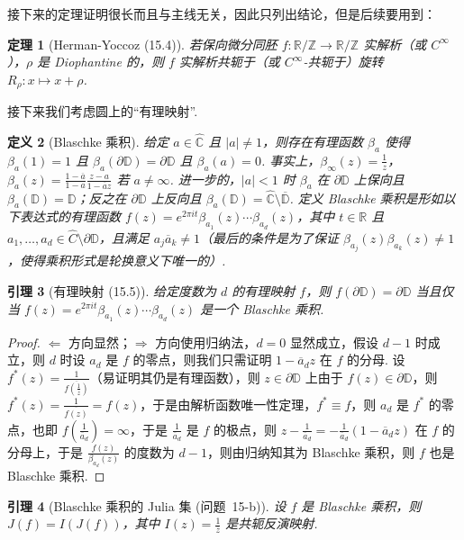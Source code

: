 \documentclass[11pt, a4paper, oneside]{ctexart}
\newtheorem{theorem}{定理}[section]
\newtheorem{definition}[theorem]{定义}
\newtheorem{lemma}[theorem]{引理}
\newcommand{\C}{\mathbb{C}}
\newcommand{\D}{\mathbb{D}}
\newcommand{\R}{\mathbb{R}}
\newcommand{\Z}{\mathbb{Z}}
\newcommand{\abs}[1]{\left|{#1}\right|}
\begin{document}
    接下来的定理证明很长而且与主线无关，因此只列出结论，但是后续要用到：
    \begin{theorem}[Herman-Yoccoz (15.4)]\label{15.4}
        若保向微分同胚 $f:\R/\Z\to \R/\Z$ 实解析（或 $C^{\infty}$），$\rho$ 是 Diophantine 的，则 $f$ 实解析共轭于（或 $C^{\infty}$-共轭于）旋转 $R_{\rho}:x\mapsto x+\rho$.
    \end{theorem}

    接下来我们考虑圆上的“有理映射”.
    \begin{definition}[Blaschke 乘积]
        给定 $a\in\hat{\C}$ 且 $\abs{a}\neq 1$，则存在有理函数 $\beta_a$ 使得 $\beta_a(1)=1$ 且 $\beta_a(\partial \D)=\partial\D$ 且 $\beta_a(a)=0$. 事实上，$\beta_{\infty}(z)=\frac{1}{z}$，$\beta_a(z)=\frac{1-\overline{a}}{1-a}\frac{z-a}{1-\overline{a}z}$ 若 $a\neq\infty$. 进一步的，$\abs{a}<1$ 时 $\beta_a$ 在 $\partial \D$ 上保向且 $\beta_a(\D)=\D$；反之在 $\partial \D$ 上反向且 $\beta_a(\D)=\hat{\C}\setminus \overline{\D}$. 定义 Blaschke 乘积是形如以下表达式的有理函数 $f(z)=e^{2\pi it}\beta_{a_1}(z)\cdots\beta_{a_d}(z)$，其中 $t\in\R$ 且 $a_1,\ldots,a_d\in\hat{C}\setminus \partial\D$，且满足 $a_j\overline{a}_k\neq 1$（最后的条件是为了保证 $\beta_{a_j}(z)\beta_{a_k}(z)\neq 1$，使得乘积形式是轮换意义下唯一的）.
    \end{definition}
    \begin{lemma}[有理映射 (15.5)]
        给定度数为 $d$ 的有理映射 $f$，则 $f(\partial\D)=\partial\D$ 当且仅当 $f(z)=e^{2\pi it}\beta_{a_1}(z)\cdots\beta_{a_d}(z)$ 是一个 Blaschke 乘积.
    \end{lemma}
    \begin{proof}
        $\Leftarrow$ 方向显然；$\Rightarrow$ 方向使用归纳法，$d=0$ 显然成立，假设 $d-1$ 时成立，则 $d$ 时设 $a_d$ 是 $f$ 的零点，则我们只需证明 $1-\overline{a}_d z$ 在 $f$ 的分母. 设 $f^*(z)=\frac{1}{\overline{f(\frac{1}{\overline{z}})}}$（易证明其仍是有理函数），则 $z\in\partial\D$ 上由于 $f(z)\in\partial\D$，则 $f^*(z)=\frac{1}{\overline{f(z)}}=f(z)$，于是由解析函数唯一性定理，$f^*\equiv f$，则 $a_d$ 是 $f^*$ 的零点，也即 $f(\frac{1}{\overline{a}_d})=\infty$，于是 $\frac{1}{\overline{a}_d}$ 是 $f$ 的极点，则 $z-\frac{1}{\overline{a}_d}=-\frac{1}{\overline{a}_d}(1-\overline{a}_d z)$ 在 $f$ 的分母上，于是 $\frac{f(z)}{\beta_{a_d}(z)}$ 的度数为 $d-1$，则由归纳知其为 Blaschke 乘积，则 $f$ 也是 Blaschke 乘积.
    \end{proof}
    \begin{lemma}[Blaschke 乘积的 Julia 集 (问题~15-b)]
        设 $f$ 是 Blaschke 乘积，则 $J(f)=I(J(f))$，其中 $I(z)=\frac{1}{\overline{z}}$ 是共轭反演映射.
    \end{lemma}
\end{document}
